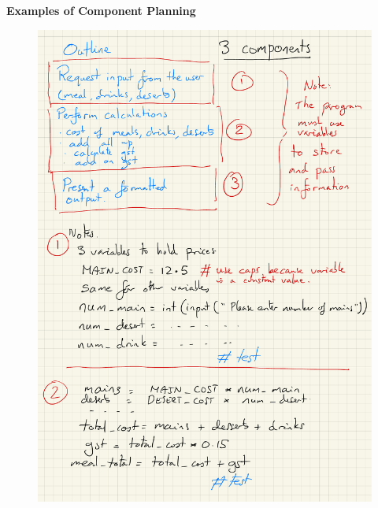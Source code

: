 \documentclass[a4paper,12pt]{article}
\begin{document}
\newpage
\textbf{Examples of Component Planning}\\
\begin{figure} [!h]
	\centering
	\includegraphics[width=12cm]{iterative_processes/simple_planning_1.pdf}
\end{figure}
\end{document}

